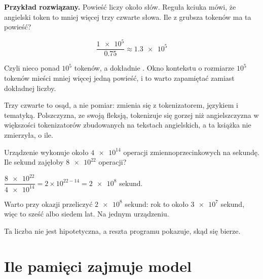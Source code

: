 \begin{fr}
\textbf{Przykład rozwiązany.} Powieść liczy około  słów.
Reguła kciuka mówi, że angielski token to mniej więcej trzy czwarte słowa.
Ile z grubsza tokenów ma ta powieść?

\[ \frac{\num{1e5}}{\num{0.75}} \approx \num{1.3e5} \]

Czyli nieco ponad $10^{5}$ tokenów, a dokładnie . Okno
kontekstu o rozmiarze $10^{5}$ tokenów mieści mniej więcej jedną powieść, i to
warto zapamiętać zamiast dokładnej liczby.

\begin{note}
Trzy czwarte to osąd, a nie pomiar: zmienia się z tokenizatorem, językiem i
tematyką. Polszczyzna, ze swoją fleksją, tokenizuje się gorzej niż
angielszczyzna w większości tokenizatorów zbudowanych na tekstach angielskich,
a ta książka nie zmierzyła, o ile.
\end{note}

\yourturn
Urządzenie wykonuje około $\num{4e14}$ operacji zmiennoprzecinkowych na
sekundę. Ile sekund zajęłoby $\num{8e22}$ operacji?
\dotline
\nextframe
\end{fr}

\begin{fr}
\begin{ansblock}
$\dfrac{\num{8e22}}{\num{4e14}} = 2 \times 10^{22-14} = \num{2e8}$ sekund.

Warto przy okazji przeliczyć $\num{2e8}$ sekund: rok to około $\num{3e7}$
sekund, więc to sześć albo siedem lat. Na jednym urządzeniu.
\end{ansblock}

Ta liczba nie jest hipotetyczna, a reszta programu pokazuje, skąd się bierze.
\end{fr}


\section{Ile pamięci zajmuje model}
\label{sec:F01-sizing}

